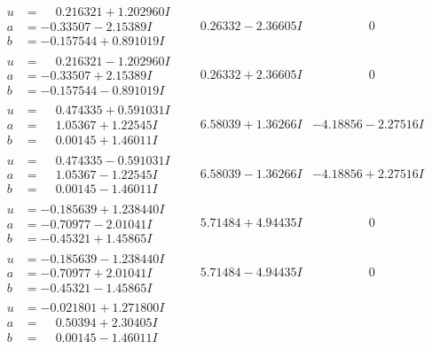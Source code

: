 \documentclass[1p]{elsarticle_modified}
\theoremstyle{definition}
\begin{document}
$$\begin{array}{c|c|c}
\begin{aligned}
u &= \phantom{-}0.216321 + 1.202960 I \\
a &= -0.33507 - 2.15389 I \\
b &= -0.157544 + 0.891019 I\end{aligned}
 & \phantom{-}0.26332 - 2.36605 I & \phantom{-0.000000 } 0 \\ \hline\begin{aligned}
u &= \phantom{-}0.216321 - 1.202960 I \\
a &= -0.33507 + 2.15389 I \\
b &= -0.157544 - 0.891019 I\end{aligned}
 & \phantom{-}0.26332 + 2.36605 I & \phantom{-0.000000 } 0 \\ \hline\begin{aligned}
u &= \phantom{-}0.474335 + 0.591031 I \\
a &= \phantom{-}1.05367 + 1.22545 I \\
b &= \phantom{-}0.00145 + 1.46011 I\end{aligned}
 & \phantom{-}6.58039 + 1.36266 I & -4.18856 - 2.27516 I \\ \hline\begin{aligned}
u &= \phantom{-}0.474335 - 0.591031 I \\
a &= \phantom{-}1.05367 - 1.22545 I \\
b &= \phantom{-}0.00145 - 1.46011 I\end{aligned}
 & \phantom{-}6.58039 - 1.36266 I & -4.18856 + 2.27516 I \\ \hline\begin{aligned}
u &= -0.185639 + 1.238440 I \\
a &= -0.70977 - 2.01041 I \\
b &= -0.45321 + 1.45865 I\end{aligned}
 & \phantom{-}5.71484 + 4.94435 I & \phantom{-0.000000 } 0 \\ \hline\begin{aligned}
u &= -0.185639 - 1.238440 I \\
a &= -0.70977 + 2.01041 I \\
b &= -0.45321 - 1.45865 I\end{aligned}
 & \phantom{-}5.71484 - 4.94435 I & \phantom{-0.000000 } 0 \\ \hline\begin{aligned}
u &= -0.021801 + 1.271800 I \\
a &= \phantom{-}0.50394 + 2.30405 I \\
b &= \phantom{-}0.00145 - 1.46011 I\end{aligned}

\end{array}$$
\end{document}
